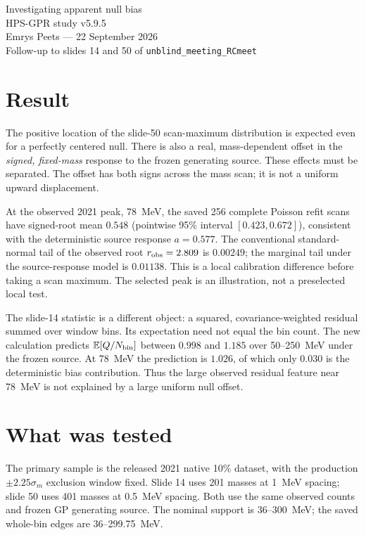 \documentclass[10pt]{article}
\newcommand{\E}{\mathbb E}\newcommand{\Var}{\operatorname{Var}}\newcommand{\Cov}{\operatorname{Cov}}
\begin{document}
\begin{center}
{\LARGE Investigating apparent null bias}\\[7pt]
{\large HPS-GPR study v5.9.5}\\[4pt]
Emrys Peets --- 22 September 2026\\
\small Follow-up to slides 14 and 50 of \texttt{unblind\_meeting\_RCmeet}
\end{center}

\section*{Result}
The positive location of the slide-50 scan-maximum distribution is expected even
for a perfectly centered null. There is also a real, mass-dependent offset in
the \emph{signed, fixed-mass} response to the frozen generating source. These
effects must be separated. The offset has both signs across the mass scan; it
is not a uniform upward displacement.

At the observed 2021 peak, 78~MeV, the saved 256 complete Poisson refit scans
have signed-root mean $0.548$ (pointwise 95\% interval $[0.423,0.672]$),
consistent with the deterministic source response $a=0.577$. The conventional
standard-normal tail of the observed root $r_{\rm obs}=2.809$ is $0.00249$;
the marginal tail under the source-response model is $0.01138$.
This is a local calibration difference before taking a scan maximum.
The selected peak is an illustration, not a preselected local test.

The slide-14 statistic is a different object: a squared, covariance-weighted
residual summed over window bins. Its expectation need not equal the bin
count. The new calculation predicts $\E[Q/N_{\rm bin}]$ between $0.998$ and
$1.185$ over 50--250~MeV under the frozen source. At 78~MeV the prediction is
$1.026$, of which only $0.030$ is the deterministic bias contribution.
Thus the large observed residual feature near 78~MeV is not explained by a
large uniform null offset.

\section*{What was tested}
The primary sample is the released 2021 native 10\% dataset, with the production
$\pm2.25\sigma_m$ exclusion window fixed. Slide 14 uses 201 masses at 1~MeV
spacing; slide 50 uses 401 masses at 0.5~MeV spacing. Both use the same observed
counts and frozen GP generating source. The nominal support is 36--300~MeV;
the saved whole-bin edges are 36--299.75~MeV.
\end{document}
